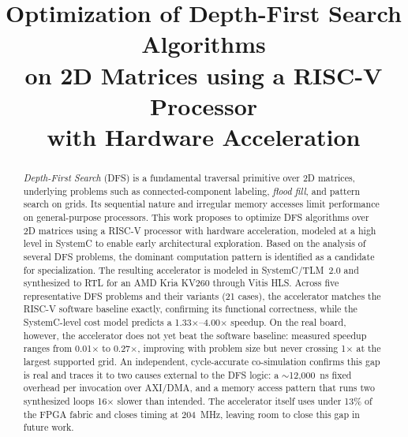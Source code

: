 \documentclass[conference]{IEEEtran}
\begin{document}
\title{Optimization of Depth-First Search Algorithms\\
on 2D Matrices using a RISC-V Processor\\
with Hardware Acceleration}

\author{
}

\maketitle

\begin{abstract}
\textit{Depth-First Search} (DFS) is a fundamental traversal primitive over 2D
matrices, underlying problems such as connected-component labeling,
\textit{flood fill}, and pattern search on grids. Its sequential nature and
irregular memory accesses limit performance on general-purpose processors. This
work proposes to optimize DFS algorithms over 2D matrices using a RISC-V
processor with hardware acceleration, modeled at a high level in SystemC to
enable early architectural exploration. Based on the analysis of several DFS
problems, the dominant computation pattern is identified as a candidate for
specialization. The resulting accelerator is modeled in SystemC/TLM~2.0 and
synthesized to RTL for an AMD Kria KV260 through Vitis HLS. Across five
representative DFS problems and their variants (21 cases), the accelerator
matches the RISC-V software baseline exactly, confirming its functional
correctness, while the SystemC-level cost model predicts a
1.33$\times$--4.00$\times$ speedup. On the real board, however, the
accelerator does not yet beat the software baseline: measured speedup ranges
from 0.01$\times$ to 0.27$\times$, improving with problem size but never
crossing 1$\times$ at the largest supported grid. An independent,
cycle-accurate co-simulation confirms this gap is real and traces it to two
causes external to the DFS logic: a $\sim$12{,}000~ns fixed overhead per
invocation over AXI/DMA, and a memory access pattern that runs two
synthesized loops 16$\times$ slower than intended. The accelerator itself
uses under 13\% of the FPGA fabric and closes timing at 204~MHz, leaving room
to close this gap in future work.
\end{abstract}
\end{document}

